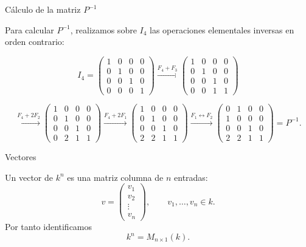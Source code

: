 \begin{frame}{Cálculo de la matriz \(P^{-1}\)}

Para calcular \(P^{-1}\), realizamos sobre \(I_4\) las operaciones
elementales inversas en orden contrario:

\[
I_4=
\begin{pmatrix}
1&0&0&0\\
0&1&0&0\\
0&0&1&0\\
0&0&0&1
\end{pmatrix}
\xrightarrow{F_4+F_3}
\begin{pmatrix}
1&0&0&0\\
0&1&0&0\\
0&0&1&0\\
0&0&1&1
\end{pmatrix}
\]

\[
\xrightarrow{F_4+2F_2}
\begin{pmatrix}
1&0&0&0\\
0&1&0&0\\
0&0&1&0\\
0&2&1&1
\end{pmatrix}
\xrightarrow{F_4+2F_1}
\begin{pmatrix}
1&0&0&0\\
0&1&0&0\\
0&0&1&0\\
2&2&1&1
\end{pmatrix}
\xrightarrow{F_1\leftrightarrow F_2}
\begin{pmatrix}
0&1&0&0\\
1&0&0&0\\
0&0&1&0\\
2&2&1&1
\end{pmatrix}
={P^{-1}}.
\]


\end{frame}

\begin{frame}{Vectores}

\begin{definition}
Un \alert{vector} de \(k^n\) es una matriz columna de \(n\) entradas:
\[
v=
\begin{pmatrix}
v_1\\
v_2\\
\vdots\\
v_n
\end{pmatrix},
\qquad v_1,\ldots,v_n\in k.
\]
Por tanto identificamos
\[
k^n=M_{n\times 1}(k).
\]
\end{definition}

\end{frame}

